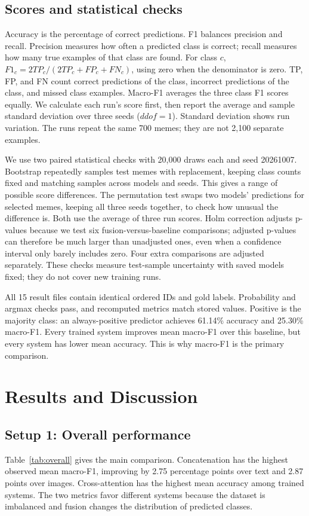\documentclass[11pt,a4paper]{article}
\begin{document}
\subsection{Scores and statistical checks}
Accuracy is the percentage of correct predictions. F1 balances precision and recall. Precision measures how often a predicted class is correct; recall measures how many true examples of that class are found. For class $c$, $F1_c=2TP_c/(2TP_c+FP_c+FN_c)$, using zero when the denominator is zero. TP, FP, and FN count correct predictions of the class, incorrect predictions of the class, and missed class examples. Macro-F1 averages the three class F1 scores equally. We calculate each run's score first, then report the average and sample standard deviation over three seeds ($ddof=1$). Standard deviation shows run variation. The runs repeat the same 700 memes; they are not 2,100 separate examples.

We use two paired statistical checks with 20,000 draws each and seed 20261007. Bootstrap repeatedly samples test memes with replacement, keeping class counts fixed and matching samples across models and seeds. This gives a range of possible score differences. The permutation test swaps two models' predictions for selected memes, keeping all three seeds together, to check how unusual the difference is. Both use the average of three run scores. Holm correction adjusts p-values because we test six fusion-versus-baseline comparisons; adjusted p-values can therefore be much larger than unadjusted ones, even when a confidence interval only barely includes zero. Four extra comparisons are adjusted separately. These checks measure test-sample uncertainty with saved models fixed; they do not cover new training runs.

All 15 result files contain identical ordered IDs and gold labels. Probability and argmax checks pass, and recomputed metrics match stored values. Positive is the majority class: an always-positive predictor achieves 61.14\% accuracy and 25.30\% macro-F1. Every trained system improves mean macro-F1 over this baseline, but every system has lower mean accuracy. This is why macro-F1 is the primary comparison.

\section{Results and Discussion}
\label{sec:results}

\subsection{Setup 1: Overall performance}
Table~\ref{tab:overall} gives the main comparison. Concatenation has the highest observed mean macro-F1, improving by 2.75 percentage points over text and 2.87 points over images. Cross-attention has the highest mean accuracy among trained systems. The two metrics favor different systems because the dataset is imbalanced and fusion changes the distribution of predicted classes.
\end{document}
